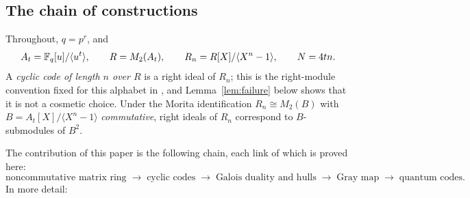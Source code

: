 \subsection{The chain of constructions}

Throughout, $q=p^r$, and
\[
  A_t=\mathbb F_q[u]/\langle u^t\rangle,\qquad
  R=M_2(A_t),\qquad
  R_n=R[X]/\langle X^n-1\rangle,\qquad
  N=4tn .
\]
A \emph{cyclic code of length $n$ over $R$} is a right ideal of $R_n$; this is
the right-module convention fixed for this alphabet in
\cite{Alahmadi2013CyclicM2F2}, and Lemma~\ref{lem:failure} below shows that it
is not a cosmetic choice. Under the Morita identification $R_n\cong M_2(B)$ with
$B=A_t[X]/\langle X^n-1\rangle$ \emph{commutative}, right ideals of $R_n$
correspond to $B$-submodules of $B^2$.

The contribution of this paper is the following chain, each link of which is
proved here:
\[
  \boxed{\text{noncommutative matrix ring}}
  \;\longrightarrow\;
  \boxed{\text{cyclic codes}}
  \;\longrightarrow\;
  \boxed{\text{Galois duality and hulls}}
  \;\longrightarrow\;
  \boxed{\text{Gray map}}
  \;\longrightarrow\;
  \boxed{\text{quantum codes}} .
\]
In more detail:


